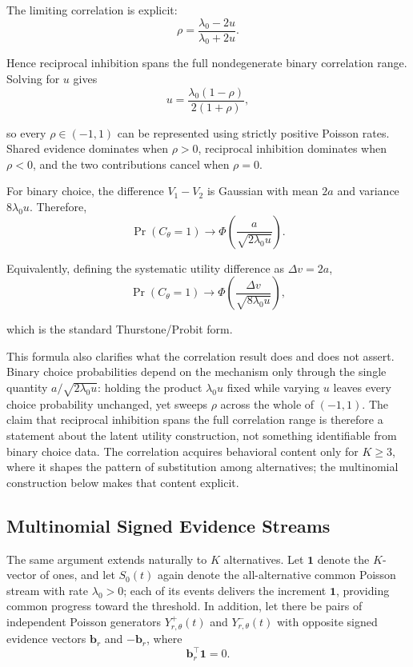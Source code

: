 \documentclass[
  man,
  floatsintext,
  longtable,
  a4paper,
  nolmodern,
  notxfonts,
  notimes,
  colorlinks=true,linkcolor=blue,citecolor=blue,urlcolor=blue]{apa7}
\begin{document}
The limiting correlation is explicit: \[
\rho
=
\frac{\lambda_0-2u}{\lambda_0+2u}.
\]

Hence reciprocal inhibition spans the full nondegenerate binary
correlation range. Solving for \(u\) gives \[
u
=
\frac{\lambda_0(1-\rho)}
{2(1+\rho)},
\]

so every \(\rho\in(-1,1)\) can be represented using strictly positive
Poisson rates. Shared evidence dominates when \(\rho>0\), reciprocal
inhibition dominates when \(\rho<0\), and the two contributions cancel
when \(\rho=0\).

For binary choice, the difference \(V_1-V_2\) is Gaussian with mean
\(2a\) and variance \(8\lambda_0 u\). Therefore, \[
\Pr(C_\theta=1)
\longrightarrow
\Phi
\left(
\frac{a}{\sqrt{2\lambda_0 u}}
\right).
\]

Equivalently, defining the systematic utility difference as
\(\Delta v=2a\), \[
\Pr(C_\theta=1)
\longrightarrow
\Phi
\left(
\frac{\Delta v}{\sqrt{8\lambda_0 u}}
\right),
\]

which is the standard Thurstone/Probit form.

This formula also clarifies what the correlation result does and does
not assert. Binary choice probabilities depend on the mechanism only
through the single quantity \(a/\sqrt{2\lambda_0 u}\): holding the
product \(\lambda_0 u\) fixed while varying \(u\) leaves every choice
probability unchanged, yet sweeps \(\rho\) across the whole of
\((-1,1)\). The claim that reciprocal inhibition spans the full
correlation range is therefore a statement about the latent utility
construction, not something identifiable from binary choice data. The
correlation acquires behavioral content only for \(K\geq 3\), where it
shapes the pattern of substitution among alternatives; the multinomial
construction below makes that content explicit.

\subsection{Multinomial Signed Evidence
Streams}\label{multinomial-signed-evidence-streams}

The same argument extends naturally to \(K\) alternatives. Let
\(\mathbf 1\) denote the \(K\)-vector of ones, and let \(S_0(t)\) again
denote the all-alternative common Poisson stream with rate
\(\lambda_0>0\); each of its events delivers the increment
\(\mathbf 1\), providing common progress toward the threshold. In
addition, let there be pairs of independent Poisson generators
\(Y_{r,\theta}^{+}(t)\) and \(Y_{r,\theta}^{-}(t)\) with opposite signed
evidence vectors \(\mathbf b_r\) and \(-\mathbf b_r\), where \[
\mathbf b_r^\top\mathbf 1=0.
\]
\end{document}
